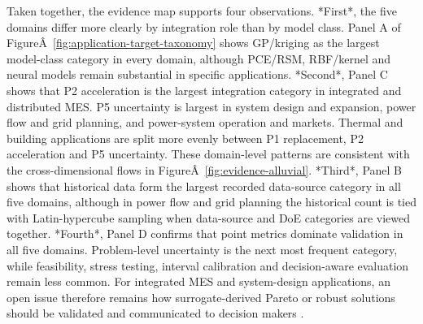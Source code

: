 Taken together, the evidence map supports four observations. *First*,
the five domains differ more clearly by integration role than by model
class. Panel A of
FigureÂ~\ref{fig:application-target-taxonomy} shows GP/kriging as the
largest model-class category in every domain, although PCE/RSM,
RBF/kernel and neural models remain substantial in specific
applications. *Second*, Panel C shows that P2 acceleration is the
largest integration category in integrated and distributed MES. P5
uncertainty is largest in system design and expansion, power flow and
grid planning, and power-system operation and markets. Thermal and
building applications are split more evenly between P1 replacement, P2
acceleration and P5 uncertainty. These
domain-level patterns are consistent with the cross-dimensional flows
in FigureÂ~\ref{fig:evidence-alluvial}. *Third*, Panel B shows that
historical data form the largest recorded data-source category in all
five domains, although in power flow and grid planning the historical
count is tied with Latin-hypercube sampling when data-source and DoE
categories are viewed together.
*Fourth*, Panel D confirms that point metrics dominate validation in all
five domains. Problem-level uncertainty is the next most frequent
category, while feasibility, stress testing, interval calibration and
decision-aware evaluation remain less common. For integrated MES and
system-design applications, an open issue therefore remains how
surrogate-derived Pareto or robust solutions should be validated and
communicated to decision makers
\cite{Mylonopoulos202332697,Lim2025}.
